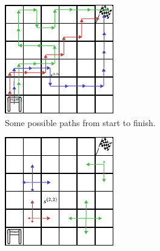     \begin{figure}
        \centering
        \begin{subfigure}[b]{0.49\textwidth}
            \centering
            \includegraphics[width=\textwidth]{figures/ch4/grid_world_sec_1.pdf}
            \caption{Some possible paths from start to finish.\\ \ewe}
            \label{fig:4:shortest_path_intro_a}
        \end{subfigure}
        \hfill
        \begin{subfigure}[b]{0.49\textwidth}
            \centering
            \includegraphics[width=\textwidth]{figures/ch4/grid_world_sec_1_entropy.pdf}

\end{subfigure}
\end{figure}
